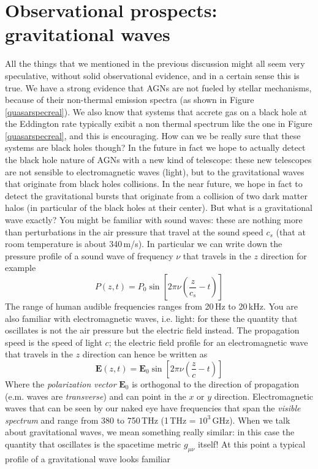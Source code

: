 \section{Observational prospects: gravitational waves}
All the things that we mentioned in the previous discussion might all seem very speculative, without solid observational evidence, and in a certain sense this is true. We have a strong evidence that AGNs are not fueled by stellar mechanisms, because of their non-thermal emission spectra (as shown in Figure \ref{quasarspecreal}). We also know that systems that accrete gas on a black hole at the Eddington rate typically exibit a non thermal spectrum like the one in Figure \ref{quasarspecreal}, and this is encouraging. How can we be really sure that these systems are black holes though? In the future in fact we hope to actually detect the black hole nature of AGNs with a new kind of telescope: these new telescopes are not sensible to electromagnetic waves (light), but to the gravitational waves that originate from black holes collisions. In the near future, we hope in fact to detect the gravitational bursts that originate from a collision of two dark matter halos (in particular of the black holes at their center). But what is a gravitational wave exactly? You might be familiar with sound waves: these are nothing more than perturbations in the air pressure that travel at the sound speed $c_s$ (that at room temperature is about 340\,m/s). In particular we can write down the pressure profile of a sound wave of frequency $\nu$ that travels in the $z$ direction for example
\begin{equation}
P(z,t)=P_0\sin{\left[2\pi\nu\left(\frac{z}{c_s}-t\right)\right]}
\end{equation}  
The range of human audible frequencies ranges from 20\,Hz to 20\,kHz. You are also familiar with electromagnetic waves, i.e. light: for these the quantity that oscillates is not the air pressure but the electric field instead. The propagation speed is the speed of light $c$; the electric field profile for an electromagnetic wave that travels in the $z$ direction can hence be written as 
\begin{equation}
\mathbf{E}(z,t) = \mathbf{E}_0\sin{\left[2\pi\nu\left(\frac{z}{c}-t\right)\right]}
\end{equation} 
Where the \textit{polarization vector} $\mathbf{E}_0$ is orthogonal to the direction of propagation (e.m. waves are \textit{transverse}) and can point in the $x$ or $y$ direction. Electromagnetic waves that can be seen by our naked eye have frequencies that span the \textit{visible spectrum} and range from 380 to 750\,THz (1\,THz = $10^3$\,GHz). When we talk about gravitational waves, we mean something really similar: in this case the quantity that oscillates is the spacetime metric $g_{\mu\nu}$ itself! At this point a typical profile of a gravitational wave looks familiar
